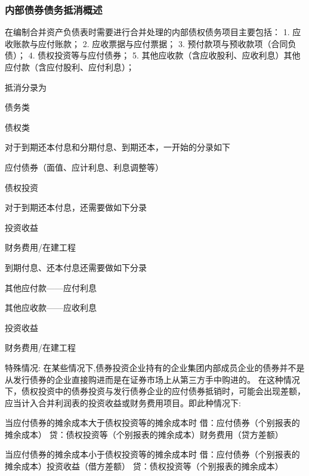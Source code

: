 \documentclass[UTF8,12pt]{ctexart}
\newenvironment{Dr}{%
	\begin{list}{}%
		{
			\setlength{\leftmargin}{2em}
			\setlength{\labelwidth}{2em}
			\setlength{\labelsep}{0pt}
			\setlength{\itemindent}{0pt}
			\setlength{\listparindent}{0pt}
			\setlength{\parsep}{0pt}
			\setlength{\topsep}{0pt}
		}
		\item[\textbf{借：}]
	}{%
	\end{list}
}
\newenvironment{Cr}{%
	\begin{list}{}%
		{
			\setlength{\leftmargin}{2em}
			\setlength{\labelwidth}{2em}
			\setlength{\labelsep}{0pt}
			\setlength{\itemindent}{0pt}
			\setlength{\listparindent}{0pt}
			\setlength{\parsep}{0pt}
			\setlength{\topsep}{0pt}
		}
		\item[\textbf{贷：}]
	}{%
	\end{list}
}
\numberwithin{equation}{section} %
\numberwithin{figure}{section}
\numberwithin{table}{section}
\begin{document}
	\subsubsection{内部债券债务抵消概述}
	在编制合并资产负债表时需要进行合并处理的内部债权债务项目主要包括：
	1.	应收账款与应付账款；
	2.	应收票据与应付票据；
	3.	预付款项与预收款项（合同负债）；
	4.	债权投资等与应付债券；
	5.	其他应收款（含应收股利、应收利息）其他应付款（含应付股利、应付利息）；
	
	抵消分录为
	\begin{Dr}
		债务类
	\end{Dr}
	\begin{Cr}
		债权类
	\end{Cr}
	
	对于到期还本付息和分期付息、到期还本，一开始的分录如下
	\begin{Dr}
		应付债券（面值、应计利息、利息调整等）
	\end{Dr}
	\begin{Cr}
		债权投资
	\end{Cr}
	
	对于到期还本付息，还需要做如下分录
	\begin{Dr}
		投资收益
	\end{Dr}
	\begin{Cr}
		财务费用/在建工程
	\end{Cr}
	
	到期付息、还本付息还需要做如下分录
	\begin{Dr}
		其他应付款——应付利息
	\end{Dr}
	\begin{Cr}
		其他应收款——应收利息
	\end{Cr}
	\begin{Dr}
		投资收益
	\end{Dr}
	\begin{Cr}
		财务费用/在建工程
	\end{Cr}
	
	特殊情况:
	在某些情况下,债券投资企业持有的企业集团内部成员企业的债券并不是从发行债券的企业直接购进而是在证券市场上从第三方手中购进的。
	在这种情况下，债权投资中的债券投资与发行债券企业的应付债券抵销时，可能会出现差额，应当计入合并利润表的投资收益或财务费用项目。即此种情况下:
	
	当应付债券的摊余成本大于债权投资等的摊余成本时
	借：应付债券（个别报表的摊余成本）
	贷：债权投资等（个别报表的摊余成本）财务费用（贷方差额）
	
	当应付债券的摊余成本小于债权投资等的摊余成本时
	借：应付债券（个别报表的摊余成本）投资收益（借方差额）
	贷：债权投资等（个别报表的摊余成本）
	
\end{document}
